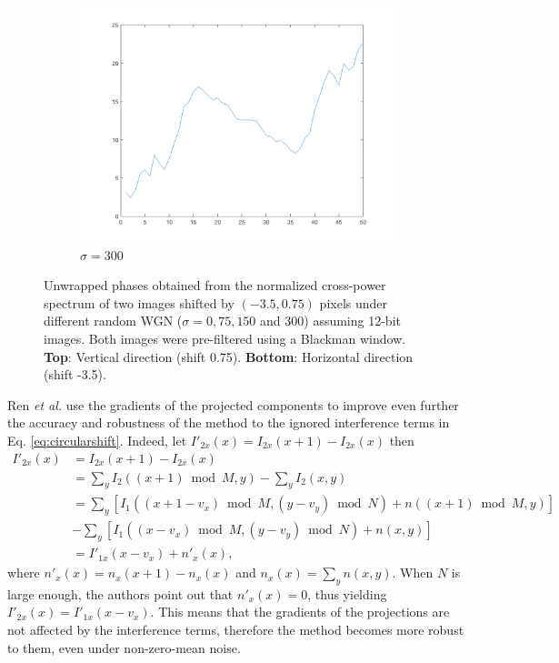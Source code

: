 \begin{figure}[htpb]
\begin{subfigure}{.25\textwidth}
\includegraphics[width=1\textwidth]{img/ProjYPCsigma300}
\caption{$\sigma = 300$}
\end{subfigure}
\caption{Unwrapped phases obtained from the normalized cross-power spectrum of two images shifted by $(-3.5, 0.75)$ pixels under different random WGN ($\sigma=0,75,150$ and $300$) assuming 12-bit images. Both images were pre-filtered using a Blackman window. \textbf{Top}: Vertical direction (shift 0.75). \textbf{Bottom}: Horizontal direction (shift -3.5).}
\label{fig:projPC}
\end{figure}


Ren \emph{et al.} \cite{Ren_2014} use the gradients of the projected components to improve even further the accuracy and robustness of the method to the ignored interference terms in Eq. \eqref{eq:circularshift}. Indeed, let $I'_{2x}(x) = I_{2x}(x+1) - I_{2x}(x)$ then 
\begin{align}
I'_{2x}(x) &= I_{2x}(x+1) - I_{2x}(x)\\
&= \sum_y I_2((x+1) \bmod M,y) - \sum_y I_2(x,y)\\
\nonumber &= \sum_y \left[I_1((x+1-v_x) \bmod M, (y-v_y) \bmod N) + n((x+1) \bmod M, y)\right]\\
&- \sum_y \left[I_1((x-v_x) \bmod M, (y-v_y) \bmod N) + n(x, y)\right]\\
&= I'_{1x}(x-v_x) + n'_x(x),
\end{align}
where $n'_x(x) = n_x(x+1) - n_x(x)$ and $n_x(x) = \sum_y n(x,y)$. When $N$ is large enough, the authors point out that $n'_x(x) = 0$, thus yielding $I'_{2x}(x) = I'_{1x}(x-v_x)$. This means that the gradients of the projections are not affected by the interference terms, therefore the method becomes more robust to them, even under non-zero-mean noise. 

